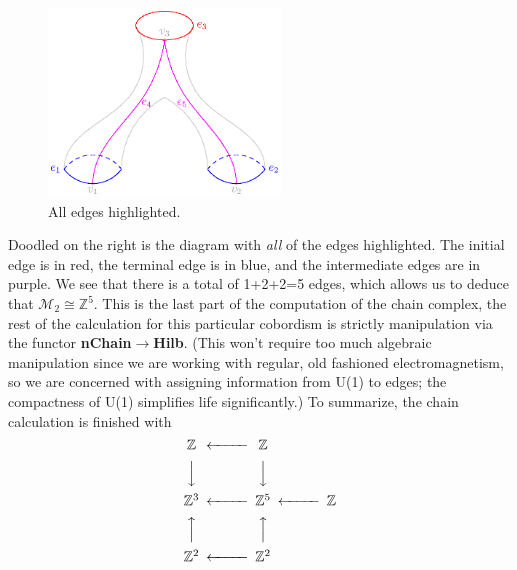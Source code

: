 \documentclass[draft]{amsart}
\numberwithin{equation}{section}
\begin{document}
\begin{figure}
  \begin{center}
    \includegraphics[width=0.55\textwidth]{img/img3.eps}
  \end{center}
  \caption{All edges highlighted.}
\end{figure}
Doodled on the right is the diagram with \emph{all} of the edges
highlighted. The initial edge is in red, the terminal edge is in
blue, and the intermediate edges are in purple. We see that there
is a total of 1+2+2=5 edges, which allows us to deduce that
$\mathcal{M}_{2}\cong\mathbb{Z}^{5}$. This is the last part of
the computation of the chain complex, the rest of the calculation
for this particular cobordism is strictly manipulation via the
functor \textbf{nChain}$\to$\textbf{Hilb}. (This won't require
too much algebraic manipulation since we are working with
regular, old fashioned electromagnetism, so we are concerned with
assigning information from U(1) to edges; the compactness of U(1)
simplifies life significantly.) To summarize, the chain
calculation is finished with
\begin{equation}\begin{CD}
\mathbb{Z}     @<<< \mathbb{Z} \\
@VVV                 @VVV\\
\mathbb{Z}^{3} @<<< \mathbb{Z}^{5} @<<< \mathbb{Z} \\
@AAA                 @AAA\\
\mathbb{Z}^{2}  @<<< \mathbb{Z}^{2}
\end{CD}\end{equation}
\end{document}
